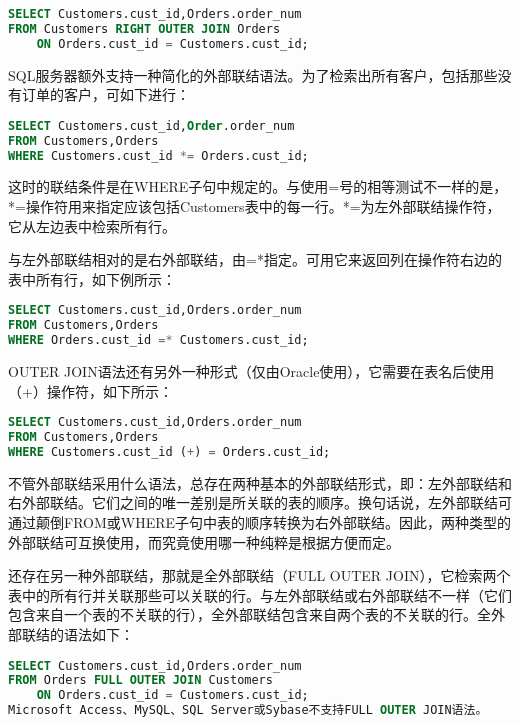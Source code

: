 \begin{lstlisting}[language=SQL]
SELECT Customers.cust_id,Orders.order_num
FROM Customers RIGHT OUTER JOIN Orders
	ON Orders.cust_id = Customers.cust_id;
\end{lstlisting}

SQL服务器额外支持一种简化的外部联结语法。为了检索出所有客户，包括那些没有订单的客户，可如下进行：


\begin{lstlisting}[language=SQL]
SELECT Customers.cust_id,Order.order_num
FROM Customers,Orders
WHERE Customers.cust_id *= Orders.cust_id;
\end{lstlisting}

这时的联结条件是在WHERE子句中规定的。与使用=号的相等测试不一样的是，*=操作符用来指定应该包括Customers表中的每一行。*=为左外部联结操作符，它从左边表中检索所有行。

与左外部联结相对的是右外部联结，由=*指定。可用它来返回列在操作符右边的表中所有行，如下例所示：



\begin{lstlisting}[language=SQL]
SELECT Customers.cust_id,Orders.order_num
FROM Customers,Orders
WHERE Orders.cust_id =* Customers.cust_id;
\end{lstlisting}

OUTER JOIN语法还有另外一种形式（仅由Oracle使用），它需要在表名后使用（+）操作符，如下所示：



\begin{lstlisting}[language=SQL]
SELECT Customers.cust_id,Orders.order_num
FROM Customers,Orders
WHERE Customers.cust_id (+) = Orders.cust_id;
\end{lstlisting}


不管外部联结采用什么语法，总存在两种基本的外部联结形式，即：左外部联结和右外部联结。它们之间的唯一差别是所关联的表的顺序。换句话说，左外部联结可通过颠倒FROM或WHERE子句中表的顺序转换为右外部联结。因此，两种类型的外部联结可互换使用，而究竟使用哪一种纯粹是根据方便而定。

还存在另一种外部联结，那就是全外部联结（FULL OUTER JOIN），它检索两个表中的所有行并关联那些可以关联的行。与左外部联结或右外部联结不一样（它们包含来自一个表的不关联的行），全外部联结包含来自两个表的不关联的行。全外部联结的语法如下：

\begin{lstlisting}[language=SQL]
SELECT Customers.cust_id,Orders.order_num
FROM Orders FULL OUTER JOIN Customers
	ON Orders.cust_id = Customers.cust_id;
Microsoft Access、MySQL、SQL Server或Sybase不支持FULL OUTER JOIN语法。
\end{lstlisting}


